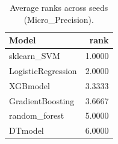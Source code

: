 \begin{table}[t]
\centering
\begin{tabular}{lr}
\toprule
Model & rank \\
\midrule
sklearn_SVM & 1.0000 \\
LogisticRegression & 2.0000 \\
XGBmodel & 3.3333 \\
GradientBoosting & 3.6667 \\
random_forest & 5.0000 \\
DTmodel & 6.0000 \\
\bottomrule
\end{tabular}
\caption{Average ranks across seeds (Micro_Precision).}
\label{tab:avg_rank_Micro_Precision}
\end{table}